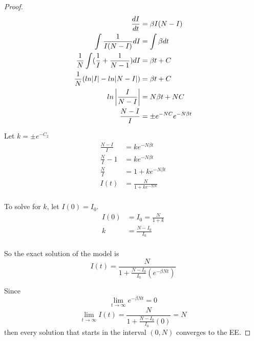 \begin{proof}
      	\begin{align*}
      		\frac{dI}{dt}                                   &= \beta I(N-I)\\
      		\int\frac{1}{I(N-I)} dI                         &= \int\beta dt\\
      		\frac{1}{N}\int (\frac{1}{I} + \frac{1}{N-1})dI &= \beta t + C\\
      		\frac{1}{N}(ln|I|- ln|N-I|)                     &= \beta t + C\\
      		ln\left|\frac{I}{N-I}\right|                           &= N \beta t + NC\\
      		\frac{N-I}{I}                                   &= \pm e^{-NC}e^{-N\beta t}\\	
      	\end{align*}
           	
      	Let $k = \pm e^{-C_2}$\\
      	\begin{align*}
      		\frac{N-I}{I} 	      &= ke^{-N\beta t}\\
      		\frac{N}{I} - 1         &= ke^{-N\beta t}\\
      		\frac{N}{I} 	      &= 1 + ke^{-N\beta t}\\
      		I(t) 			      &= \frac{N}{1 + ke^{-N\beta t}}\\
      	\end{align*}
      	
      	To solve for $k$, let $I(0) = I_0$.\\
      	\begin{align*}
      		I(0) 	&= I_0 = \frac{N}{1 + k}\\ 
      		k 		&= \frac{N - I_0}{I_0}\\
      	\end{align*}
      	
        So the exact solution of the model is
        \begin{equation}
          I(t) =  \frac{N}{1+\frac{N-I_0}{I_0}(e^{-\beta N t})}
        \end{equation}
        
        Since 
        $$\lim_{t\to\infty} e^{-\beta N t} = 0$$
       $$\lim_{t\to\infty} I(t) = \frac{N}{1 +\frac{N-I_0}{I_0}(0)} = N$$
       then every solution that starts in the interval $(0, N)$ converges to the EE. 
      \end{proof}

